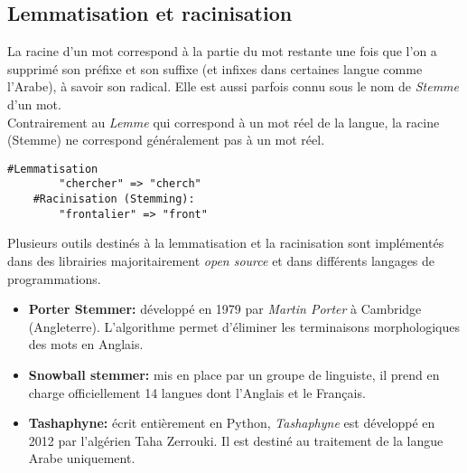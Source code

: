 \documentclass{report}
\begin{document}
\subsection{Lemmatisation et racinisation}
La racine d'un mot correspond à la partie du mot restante une fois que l'on a supprimé son préfixe et son suffixe (et infixes dans certaines langue comme l'Arabe), à savoir son radical. Elle est aussi parfois connu sous le nom de \emph{Stemme} d'un mot.\\ 
Contrairement au \emph{Lemme} qui correspond à un mot réel de la langue, la racine (Stemme) ne correspond généralement pas à un mot réel.
\begin{lstlisting}[style=code]
    #Lemmatisation 
        "chercher" => "cherch"
    #Racinisation (Stemming):
        "frontalier" => "front"  
\end{lstlisting}
Plusieurs outils destinés à la lemmatisation et la racinisation sont implémentés dans des librairies majoritairement \emph{open source} et dans différents langages de programmations.
\begin{itemize}
    \item \textbf{Porter Stemmer:} développé en 1979 par \emph{Martin Porter}  à Cambridge (Angleterre). 
    L'algorithme permet d'éliminer les terminaisons morphologiques des mots en Anglais.
    \item \textbf{Snowball stemmer:} mis en place par un groupe de linguiste, il prend en charge officiellement 14 langues dont l'Anglais et le Français. 
    \item \textbf{Tashaphyne:} écrit entièrement en Python, \emph{Tashaphyne} est développé en 2012 par l'algérien Taha Zerrouki. Il est destiné au traitement de la langue Arabe uniquement.
\end{itemize} 
\end{document}

